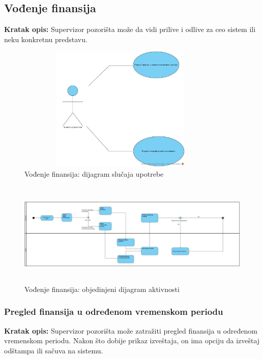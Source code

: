\documentclass[a4paper]{article}
\begin{document}

\subsection{Vođenje finansija}

 \noindent\textbf{Kratak opis:} Supervizor pozorišta može da vidi prilive i odlive za ceo sistem ili
        neku konkretnu predstavu. 

\begin{figure}[H]
  \begin{center}
      \includegraphics[width=100mm,height=60mm]{../images/usecase_vodjenje_finansija.jpg}
  \end{center}
  \caption{Vođenje finansija: dijagram slučaja upotrebe}
  \label{usecase_vodjenje_finansija}
\end{figure}

\begin{figure}[H]
  \begin{center}
      \includegraphics[width=140mm,height=50mm]{../images/activity_vodjenje_finansija.jpg}
  \end{center}
  \caption{Vođenje finansija: objedinjeni dijagram aktivnosti}
  \label{activity?vodjenje?finansija}
\end{figure}

\subsubsection{Pregled finansija u određenom vremenskom periodu}
\noindent\textbf{Kratak opis:} Supervizor pozorišta može zatražiti pregled finansija
u određenom vremenskom periodu. Nakon što dobije prikaz izveštaja, on ima opciju da izveštaj
odštampa ili sačuva na sistemu.
\end{document}
